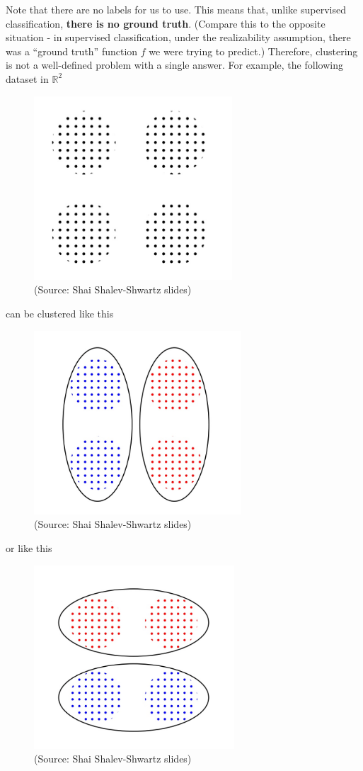 \documentclass[11pt]{article}
\newcommand{\R}{\ensuremath{\mathbb{R}}}
\begin{document}
Note that there are no labels for us to use. This means that, unlike supervised
classification, {\bf there is no ground truth}. (Compare this to the opposite
  situation - in supervised classification, under the realizability assumption,
there was a ``ground truth'' function $f$ we were trying to predict.) 
Therefore, clustering is not a
well-defined problem with a single answer. For example, the following dataset in
$\R^2$ 
\begin{figure}[H]
      \centering
      \includegraphics[height=2.7in]{cluster0.jpeg}        
      \caption{(Source: Shai Shalev-Shwartz slides)}
    \end{figure}
%
    can be clustered like this
    \begin{figure}[H]
      \centering
      \includegraphics[height=2.7in]{cluster1.jpeg}        
      \caption{(Source: Shai Shalev-Shwartz slides)}
    \end{figure}
%
    or like this
    \begin{figure}[H]
      \centering
      \includegraphics[height=2.7in]{cluster2.jpeg}        
      \caption{(Source: Shai Shalev-Shwartz slides)}
    \end{figure}
\end{document}
